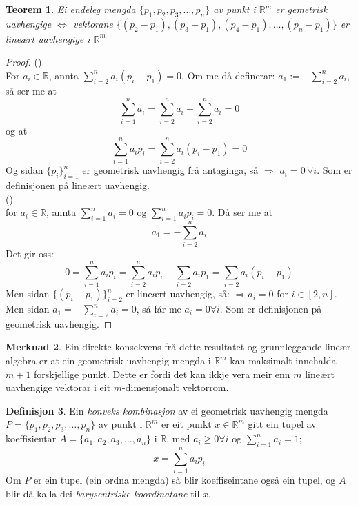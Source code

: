 \documentclass[a4paper, titlepage, 12pt, norsk]{article}
\theoremstyle{plain}
\newtheorem{theorem}{Teorem}[section]
\theoremstyle{definition}
\newtheorem{definition}[theorem]{Definisjon}
\newtheorem{remark}[theorem]{Merknad}
\newcommand{\R}{\mathbb{R}}
\begin{document}
\begin{theorem}
	Ei endeleg mengda $\{p_1, p_2, p_3, \dots, p_n \}$ av punkt i $\R^m$ er gemetrisk uavhengige $\Leftrightarrow$ vektorane $\{(p_2-p_1), (p_3-p_1), (p_4-p_1),\dots,(p_n-p_1)\}$ er lineært uavhengige i $\R^m$
\end{theorem}
\begin{proof}
	(\Rightarrow)
	\\For $a_i\in\R$, annta $\sum_{i=2}^na_i(p_i-p_1)=0$. Om me då definerar: $a_1 := -\sum_{i=2}^na_i$, så ser me at 
	\begin{equation*}
		\sum_{i=1}^na_i=\sum_{i=2}^na_i-\sum_{i=2}^na_i=0
	\end{equation*}
	og at 
	\begin{equation*}
		\sum_{i=1}^na_ip_i=\sum_{i=2}^na_i(p_i-p_1)=0
	\end{equation*}
	Og sidan $\{p_i\}_{i=1}^n$ er geometrisk uavhengig frå antaginga, så $\Rightarrow$ $a_i=0 \, \forall i$. Som er definisjonen på lineært uavhengig.
	\\(\Leftarrow)
	\\for $a_i\in\R$, annta $\sum_{i=1}^n a_i=0$ og $\sum_{i=1}^n a_ip_i=0$. Då ser me at 
	\begin{equation*}
		a_1=-\sum_{i=2}^n a_i
	\end{equation*} 
	Det gir oss: 
	\begin{equation*}
		0=\sum_{i=1}^n a_ip_i=\sum_{i=2}^n a_ip_i-\sum_{i=2}a_ip_1=\sum_{i=2}a_i(p_i-p_1)
	\end{equation*}
	Men sidan $\{(p_i-p_1)\}_{i=2}^n$ er lineært uavhengig, så: $\Rightarrow a_i = 0$ for $i\in[2,n]$. Men sidan $a_1 = -\sum_{i=2}^n a_i=0$, så får me $a_i=0 \forall i$. Som er definisjonen på geometrisk uavhengig.
\end{proof}
\begin{remark}
	Ein direkte konsekvens frå dette resultatet og grunnleggande lineær algebra er at ein geometrisk uavhengig mengda i $\R^m$ kan maksimalt innehalda $m+1$ forskjellige punkt. Dette er fordi det kan ikkje vera meir enn $m$ lineært uavhengige vektorar i eit $m$-dimensjonalt vektorrom.
\end{remark}
\begin{definition}
	Ein \emph{konveks kombinasjon} av ei geometrisk uavhengig mengda $P=\{p_1, p_2, p_3, \dots, p_n\}$ av punkt i $\R^m$ er eit punkt $x\in\R^m$ gitt ein tupel av koeffisientar $A=\{a_1, a_2, a_3, \dots, a_n\}$ i $\R$, med $a_i\geq0\forall i$ og $\sum_{i=1}^n a_i = 1;$
	\begin{equation*}
		x=\sum_{i=1}^n a_ip_i
	\end{equation*}
	Om $P$ er ein tupel (ein ordna mengda) så blir koeffiseintane også ein tupel, og $A$ blir då kalla dei \emph{barysentriske koordinatane} til $x$.
\end{definition}
\end{document}
